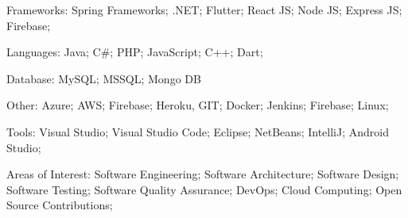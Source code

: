 

\begin{cventries}

  \cventryTec
  {
    \begin{cvitems} %
      \item {Frameworks: Spring Frameworks; .NET; Flutter; React JS; Node JS; Express JS; Firebase;}
      \item {Languages: Java; C\#; PHP; JavaScript; C++; Dart;}
      \item {Database: MySQL; MSSQL; Mongo DB}
      \item {Other: Azure; AWS; Firebase; Heroku, GIT; Docker; Jenkins; Firebase; Linux;}
      \item {Tools: Visual Studio; Visual Studio Code; Eclipse; NetBeans; IntelliJ; Android Studio;}
      \item {Areas of Interest: Software Engineering; Software Architecture; Software Design; Software Testing; Software Quality Assurance; DevOps; Cloud Computing; Open Source Contributions;}
    \end{cvitems}
  }



\end{cventries}
